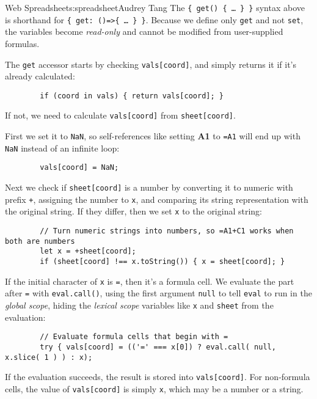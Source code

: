 \begin{aosachapter}{Web Spreadsheet}{s:spreadsheet}{Audrey Tang}
The \texttt{\{ get() \{ \ldots{} \} \}} syntax above is shorthand for
\texttt{\{ get: ()=\textgreater{}\{ \ldots{} \} \}}. Because we define
only \texttt{get} and not \texttt{set}, the variables become
\emph{read-only} and cannot be modified from user-supplied formulas.

The \texttt{get} accessor starts by checking \texttt{vals{[}coord{]}},
and simply returns it if it's already calculated:

\begin{verbatim}
        if (coord in vals) { return vals[coord]; }
\end{verbatim}

If not, we need to calculate \texttt{vals{[}coord{]}} from
\texttt{sheet{[}coord{]}}.

First we set it to \texttt{NaN}, so self-references like setting
\textbf{A1} to \texttt{=A1} will end up with \texttt{NaN} instead of an
infinite loop:

\begin{verbatim}
        vals[coord] = NaN;
\end{verbatim}

Next we check if \texttt{sheet{[}coord{]}} is a number by converting it
to numeric with prefix \texttt{+}, assigning the number to \texttt{x},
and comparing its string representation with the original string. If
they differ, then we set \texttt{x} to the original string:

\begin{verbatim}
        // Turn numeric strings into numbers, so =A1+C1 works when both are numbers
        let x = +sheet[coord];
        if (sheet[coord] !== x.toString()) { x = sheet[coord]; }
\end{verbatim}

If the initial character of \texttt{x} is \texttt{=}, then it's a
formula cell. We evaluate the part after \texttt{=} with
\texttt{eval.call()}, using the first argument \texttt{null} to tell
\texttt{eval} to run in the \emph{global scope}, hiding the
\emph{lexical scope} variables like \texttt{x} and \texttt{sheet} from
the evaluation:

\begin{verbatim}
        // Evaluate formula cells that begin with =
        try { vals[coord] = (('=' === x[0]) ? eval.call( null, x.slice( 1 ) ) : x);
\end{verbatim}

If the evaluation succeeds, the result is stored into
\texttt{vals{[}coord{]}}. For non-formula cells, the value of
\texttt{vals{[}coord{]}} is simply \texttt{x}, which may be a number or
a string.


\end{aosachapter}
